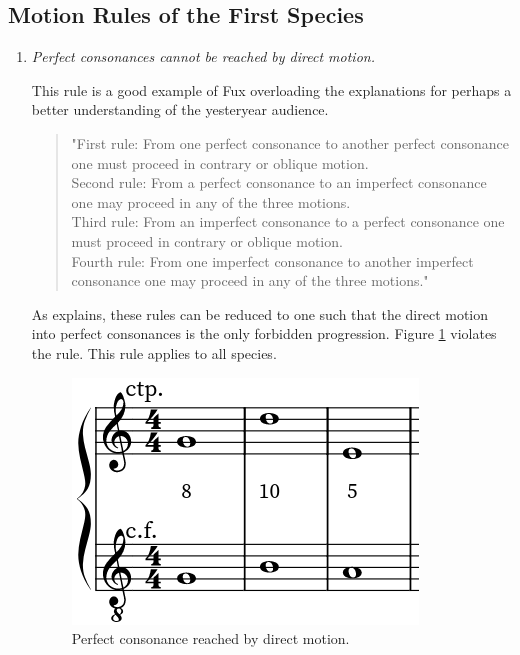 \subsection{Motion Rules of the First Species}
\begin{enumerate}[wide, label=\bfseries 1.P\arabic*]
    \item\label{rule:nopconsbydm} \textit{Perfect consonances cannot be reached by direct motion.} \parencite[p.51, 57]{GaPFr}

    This rule is a good example of Fux overloading the explanations for perhaps a better understanding of the yesteryear audience.
    \begin{quote}
        "First rule: From one perfect consonance to another perfect consonance one must proceed in contrary or oblique motion.\\
        Second rule: From a perfect consonance to an imperfect consonance one may proceed in any of the three motions.\\
        Third rule: From an imperfect consonance to a perfect consonance one must proceed in contrary or oblique motion.\\
        Fourth rule: From one imperfect consonance to another imperfect consonance one may proceed in any of the three motions."
        \textcite[p.22]{GaPEng}
    \end{quote}

    As \textcite[p.23]{Esemplare} explains, these rules can be reduced to one such that the direct motion into perfect consonances is the only forbidden progression. Figure \ref{fig:perfectdirect} violates the rule. This rule applies to all species.
    \begin{figure}[h]
        \centering
        \includegraphics[height=\fh]{Images/direct_motion_pcons.png}
        \caption{Perfect consonance reached by direct motion.}
        \label{fig:perfectdirect}
    \end{figure}


\end{enumerate}
